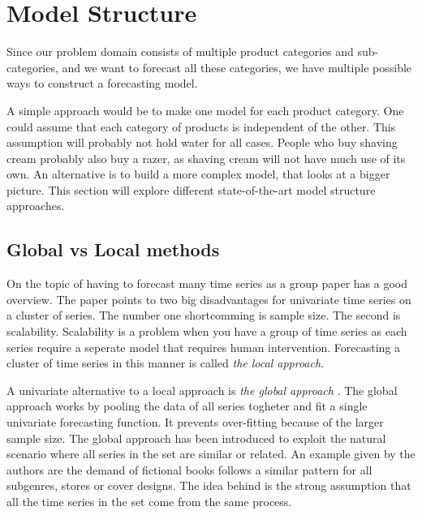 
\section{Model Structure}
\label{section:RelatedWork:Model-structure}
Since our problem domain consists of multiple product categories and sub-categories,
and we want to forecast all these categories,
we have multiple possible ways to construct a forecasting model.

A simple approach would be to make one model for each product category.
One could assume that each category of products is independent of the other.
This assumption will probably not hold water for all cases. People who buy shaving cream probably also buy a razer, as shaving cream will not have much use of its own.
An alternative is to build a more complex model, that looks at a bigger picture.
This section will explore different state-of-the-art model structure approaches.




\subsection{Global vs Local methods}
On the topic of having to forecast many time series as a group \cite{Montero-Manso2021} paper has a good overview.
The paper points to two big disadvantages for univariate time series on a cluster of series.
The number one shortcomming is sample size. The second is scalability.
Scalability is a problem when you have a group of time series as each series require a seperate model
that requires human intervention. Forecasting a cluster of time series in this manner is called
\textit{the local approach.}

A univariate alternative to a local approach is \textit{the global approach}
\citep{Rabanser2020}.
The global approach works by pooling the data of all series togheter and fit a single univariate forecasting function. It prevents over-fitting because of the larger sample size.
The global approach has been introduced to exploit the natural scenario where all series
in the set are similar or related. An example given by the authors are the demand of fictional
books follows a similar pattern for all subgenres, stores or cover designs.
The idea behind is the strong assumption that all the time series in the set
come from the same process.

